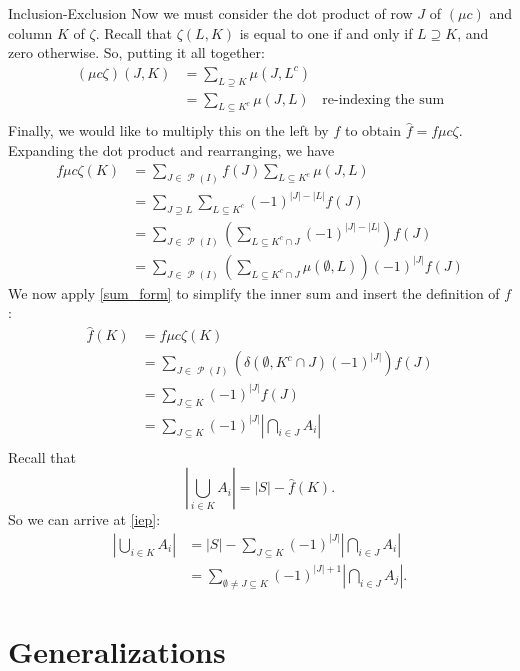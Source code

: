 \documentclass[12pt]{pom_thesis}
\DeclareMathOperator{\ps}{\mathscr{P}}
\begin{document}
\begin{chapter}{Inclusion-Exclusion}
Now we must consider the dot product of row $J$ of $(\mu c)$ and column $K$ of $\zeta$. Recall that $\zeta(L,K)$ is equal to one if and only if $L \supseteq K$, and zero otherwise. So, putting it all together:
\begin{align*}
(\mu c \zeta)(J,K) &= \sum_{L \supseteq K} \mu(J, L^c)\\
&= \sum_{L \subseteq K^c} \mu(J, L) &\text{re-indexing the sum}\\
\end{align*}
Finally, we would like to multiply this on the left by $f$ to obtain $\hat{f} = f\mu c\zeta$. Expanding the dot product and rearranging, we have
\begin{align*}
f\mu c\zeta(K) &= \sum_{J \in \ps(I)} f(J) \sum_{L \subseteq K^c} \mu(J,L)\\
&= \sum_{J \supseteq L} \sum_{L \subseteq K^c} (-1)^{|J|-|L|} f(J)\\
&= \sum_{J \in \ps(I)}\left( \sum_{L \subseteq K^c \cap J}(-1)^{|J| - |L|} \right) f(J)\\
&= \sum_{J \in \ps(I)}\left( \sum_{L \subseteq K^c \cap J}\mu(\emptyset, L)\right) (-1)^{|J|}f(J)
\end{align*}
We now apply \ref{sum_form} to simplify the inner sum and insert the definition of $f$:
\begin{align*}
\hat{f}(K) &= f\mu c\zeta(K) \\
&=  \sum_{J \in \ps(I)}(\delta(\emptyset, K^c \cap J)(-1)^{|J|} )f(J)\\
&= \sum_{J \subseteq K}(-1)^{|J|}f(J)\\
&= \sum_{J \subseteq K}(-1)^{|J|}\left| \bigcap_{i \in J} A_i\right|\\
\end{align*}
Recall that 
\[
\left| \bigcup_{i \in K} A_i \right| = |S| - \hat{f}(K).
\]
So we can arrive at \ref{iep}:
\begin{align*}
\left| \bigcup_{i \in K} A_i \right| &= |S| - \sum_{J \subseteq K}(-1)^{|J|}\left| \bigcap_{i \in J} A_i\right|\\
&= \sum_{\emptyset \neq J \subseteq K}(-1)^{|J| + 1}\left|\bigcap_{i \in J}A_j\right|.
\end{align*}
\section{Generalizations}


\end{chapter}
\end{document}

